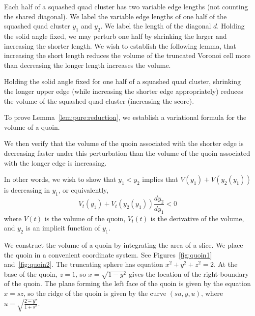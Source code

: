 Each half of a squashed quad cluster has two variable edge lengths (not counting the
shared diagonal).  We label the variable
edge lengths of one half of the squashed quad cluster $y_1$ and $y_2$.
We label the length of the diagonal $d$.
Holding the solid
angle fixed, we may perturb one half by shrinking the larger
and increasing the shorter length.
We wish to establish the following lemma, that
increasing the short length reduces the volume of the
truncated Voronoi cell
more than decreasing the longer length increases the volume.

\begin{lem}
\label{lem:pure:reduction}
Holding the solid angle fixed for one half of a squashed quad cluster,
shrinking the longer upper edge (while increasing the shorter edge appropriately)
reduces the volume of the squashed quad cluster (increasing the score).
\end{lem}

To prove Lemma~\ref{lem:pure:reduction}, we establish a variational formula for the volume of a
quoin.

We then verify that the volume of the quoin associated with the
shorter edge is decreasing
faster under this perturbation than the volume
of the quoin associated with the
longer edge is increasing.

In other words, we wish to show that $y_1 < y_2$ implies
that $V(y_1) + V(y_2(y_1))$ is decreasing in $y_1$, or
equivalently,
\[
V_t(y_1) + V_t(y_2(y_1)) \frac{dy_2}{dy_1} < 0
\]
where
$V(t)$ is the volume of the quoin, $V_t(t)$ is the
derivative of the volume, and $y_2$ is an implicit function
of $y_1$.

We construct the volume of a quoin by integrating the area of
a slice.  We place the quoin in a convenient coordinate system.
See Figures~\ref{fig:quoin1} and~\ref{fig:quoin2}.
The truncating sphere has equation $x^2 + y^2 + z^2 = 2$.
At the base of the quoin, $z=1$, so $x = \sqrt{1-y^2}$ gives
the location of the right-boundary of the quoin.
The plane forming the left face of the quoin is given by the
equation $x = s z$, so the ridge of the quoin is given by the
curve $(s u, y, u)$, where $u = \sqrt{\frac{2-y^2}{1+s^2}}$.

